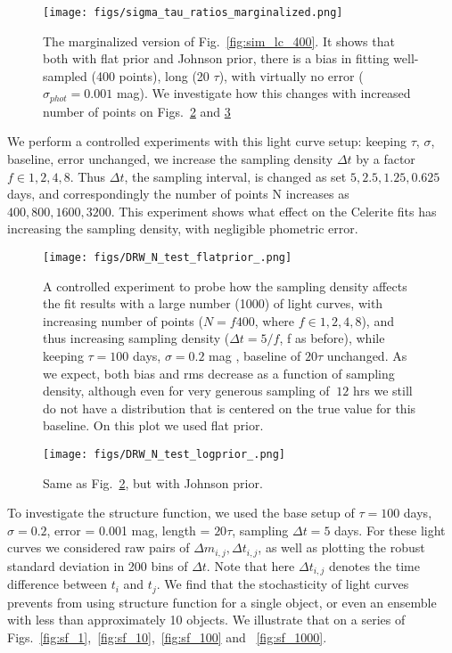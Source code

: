 \documentclass[fleqn,usenatbib]{mnras}  %
\begin{document}
\begin{figure}
\texttt{[image: figs/sigma\_tau\_ratios\_marginalized.png]}
\caption{The marginalized version of Fig.~\ref{fig:sim_lc_400}. It shows that both with flat prior and Johnson prior,  there is a bias in fitting well-sampled (400 points), long (20 $\tau$), with virtually no error ($\sigma_{phot}=0.001 $ mag). We investigate how this changes with increased number of points on Figs.~\ref{fig:sim_lc_N_pts_flat} and \ref{fig:sim_lc_N_pts_log}}
\label{fig:sim_lc_400_marg}
\end{figure}


We perform a controlled experiments with this light curve setup: keeping  $\tau$, $\sigma$, baseline, error unchanged, we increase the sampling density $\Delta t$ by a factor $f \in {1,2,4,8}$. Thus $\Delta t$, the sampling interval, is changed as set ${5,2.5, 1.25, 0.625} $ days, and correspondingly the number of points N increases as ${400,800,1600,3200}$.  This experiment shows what effect on the Celerite fits has  increasing the sampling density, with negligible phometric error.


\begin{figure}
\texttt{[image: figs/DRW\_N\_test\_flatprior\_.png]}
\caption{A controlled experiment to probe how the sampling density affects the fit results with a large number (1000) of light curves, with increasing number of points ($N = f 400$, where $f \in {1,2,4,8}$), and thus increasing sampling density ($\Delta t = 5 /f $, f as before), while keeping  $\tau=100$ days, $\sigma=0.2$ mag  , baseline of $20 \tau$ unchanged. As we expect, both bias and rms decrease as a function of sampling density, although even for very generous sampling of $~12$ hrs we still do not have a distribution that is centered on the true value for this baseline. On this plot we used flat prior. }
\label{fig:sim_lc_N_pts_flat}
\end{figure}


\begin{figure}
\texttt{[image: figs/DRW\_N\_test\_logprior\_.png]}
\caption{Same as Fig.~\ref{fig:sim_lc_N_pts_flat}, but with Johnson prior.}
\label{fig:sim_lc_N_pts_log}
\end{figure}


To investigate the structure function, we used the base setup of $\tau=100$ days,  $\sigma=0.2$, error = 0.001 mag, length = $20 \tau$, sampling $\Delta t = 5 $ days. For these light curves we considered raw pairs of  $\Delta m_{i,j}, \Delta t_{i,j}$, as well as plotting the robust standard deviation in 200 bins of $\Delta t$. Note that here $\Delta t_{i,j}$ denotes the time difference between $t_{i}$ and $t_{j}$. We find that the stochasticity of light curves prevents from using structure function for a single object, or even an ensemble with less than approximately 10 objects. We illustrate that on a series of Figs.~\ref{fig:sf_1},~\ref{fig:sf_10},~\ref{fig:sf_100} and ~\ref{fig:sf_1000}. 
\end{document}
